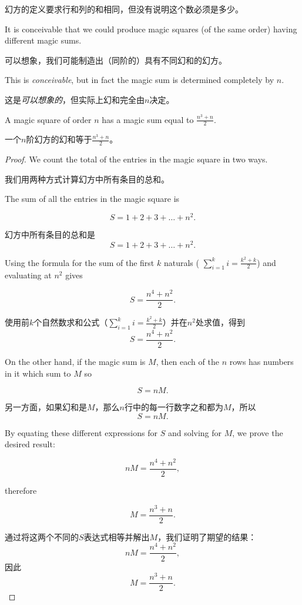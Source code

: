 幻方的定义要求行和列的和相同，但没有说明这个数必须是多少。

It is conceivable that we could produce magic squares (of the same order)
having different magic sums.

可以想象，我们可能制造出（同阶的）具有不同幻和的幻方。

This is \emph{conceivable}, but in fact the
magic sum is determined completely by $n$.

这是\emph{可以想象的}，但实际上幻和完全由$n$决定。

\begin{thm}
A magic square of order $n$ has a magic sum equal to $\displaystyle\frac{n^3+n}{2}$.
\end{thm}

\begin{thm}
一个$n$阶幻方的幻和等于$\displaystyle\frac{n^3+n}{2}$。
\end{thm}

\begin{proof}
We count the total of the entries in the magic square in two ways.

我们用两种方式计算幻方中所有条目的总和。

The sum of all the entries in the magic square is

\[ S = 1 + 2 + 3 + \ldots + n^2. \]

幻方中所有条目的总和是
\[ S = 1 + 2 + 3 + \ldots + n^2. \]

Using the formula for the sum of the first $k$ naturals ( $\sum_{i=1}^k i = \frac{k^2+k}{2}$) and evaluating at $n^2$ gives

\[ S = \frac{n^4 + n^2}{2}. \]

使用前$k$个自然数求和公式（$\sum_{i=1}^k i = \frac{k^2+k}{2}$）并在$n^2$处求值，得到
\[ S = \frac{n^4 + n^2}{2}. \]

On the other hand, if the magic sum is $M$, then each of the $n$ rows has 
numbers in it which sum to $M$ so

\[ S = nM. \]

另一方面，如果幻和是$M$，那么$n$行中的每一行数字之和都为$M$，所以
\[ S = nM. \]

By equating these different expressions for $S$ and solving for $M$, we
prove the desired result:

\[ nM = \frac{n^4 + n^2}{2}, \]

\noindent therefore

\[ M = \frac{n^3 + n}{2}. \]

通过将这两个不同的$S$表达式相等并解出$M$，我们证明了期望的结果：
\[ nM = \frac{n^4 + n^2}{2}, \]
\noindent 因此
\[ M = \frac{n^3 + n}{2}. \]
\end{proof}

